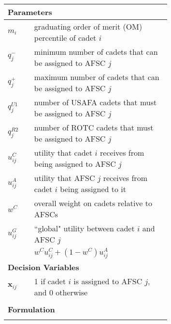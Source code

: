 \documentclass{article}
\begin{document}
\newpage
\centering
\begin{tabular}{p{0.1\linewidth}p{0.57\linewidth}}
    \multicolumn{2}{l}{\textbf{Parameters}} \\
    \hline
        $m_i$ & graduating order of merit (OM) percentile of cadet $i$ \\
        $q^-_j$ & minimum number of cadets that can be assigned to AFSC $j$\\
        $q^+_j$ & maximum number of cadets that can be assigned to AFSC $j$\\
        $q^{U1}_j$ & number of USAFA cadets that must be assigned to AFSC $j$\\
        $q^{R2}_j$ & number of ROTC cadets that must be assigned to AFSC $j$\\
        $u^{C}_{ij}$ & utility that cadet $i$ receives from being assigned to AFSC $j$ \\
        $u^{A}_{ij}$ & utility that AFSC $j$ receives from cadet $i$ being assigned to it \\
        $w^C$ & overall weight on cadets relative to AFSCs\\
        $u^{G}_{ij}$ & ``global" utility between cadet $i$ and AFSC $j$ \\
        & $w^C u^C_{ij} + (1 - w^C)u^A_{ij}$\\
    \multicolumn{2}{l}{\textbf{Decision Variables}} \\
    \hline
        $\bm{x}_{ij}$ & 1 if cadet $i$ is assigned to AFSC $j$, and 0 otherwise \\
        & \\
    \multicolumn{2}{l}{\textbf{Formulation}}\\
    \hline
    &\\
\end{tabular}
\end{document}
